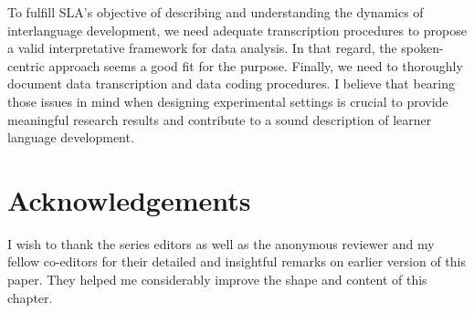 \documentclass[output=paper,colorlinks,citecolor=brown,modfonts,nonflat]{../langscibook}
\begin{document}
To fulfill SLA’s objective of describing and understanding the dynamics of interlanguage development, we need adequate transcription procedures to propose a valid interpretative framework for data analysis. In that regard, the spoken-centric approach seems a good fit for the purpose. Finally, we need to thoroughly document data transcription and data coding procedures. I believe that bearing those issues in mind when designing experimental settings is crucial to provide meaningful research results and contribute to a sound description of learner language development.

\section*{Acknowledgements}

I wish to thank the series editors as well as the anonymous reviewer and my fellow co-editors for their detailed and insightful remarks on earlier version of this paper. They helped me considerably improve the shape and content of this chapter.

{\sloppy\printbibliography[heading=subbibliography,notkeyword=this]}
\end{document}
